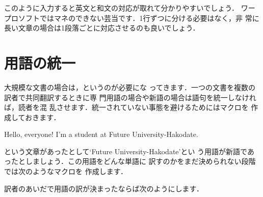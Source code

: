 このように入力すると英文と和文の対応が取れて分かりやすいでしょう．
ワープロソフトではマネのできない芸当です．1行ずつに分ける必要はなく，非
常に長い文章の場合は1段落ごとに対応させるのも良いでしょう．


\section{用語の統一}
大規模な文書の場合は，というのが必要にな
ってきます．一つの文書を複数の訳者で共同翻訳するときに専
門用語の場合や新語の場合は語句を統一しなければ，読者を混
乱させます．統一されていない事態を避けるためにはマクロを
作成しておきます．

\begin{InText}
Hello, everyone! I'm a student at Future University-Hakodate. 
\end{InText}

という文章があったとして`Future University-Hakodate'とい
う用語が新語であったとしましょう．この用語をどんな単語に
訳すのかをまだ決められない段階では次のようなマクロを
作成します．

\begin{InText}
\newcommand*{\FUN}{Future University-Hakodate}
\end{InText}

訳者のあいだで用語の訳が決まったならば次のようにします．

\begin{InText}
\newcommand*{\FUN}{公立はこだて未来大学}
\end{InText}


